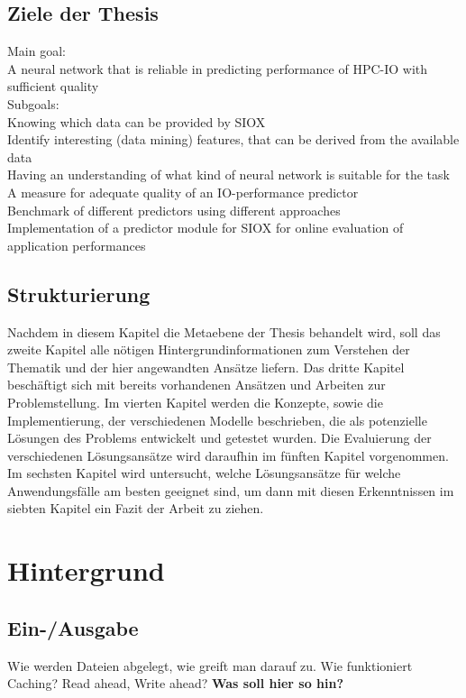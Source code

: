 \documentclass[
	12pt,
	a4paper,
	BCOR10mm,
	DIV14,
	listof=totoc,
	bibliography=totoc,
	headsepline
]{scrreprt}
\begin{document}
\section{Ziele der Thesis}
Main goal:\\
A neural network that is reliable in predicting performance of HPC-IO with sufficient quality\\

Subgoals:\\
Knowing which data can be provided by SIOX\\
Identify interesting (data mining) features, that can be derived from the available data\\
Having an understanding of what kind of neural network is suitable for the task\\
A measure for adequate quality of an IO-performance predictor \\
Benchmark of different predictors using different approaches\\
Implementation of a predictor module for SIOX for online evaluation of application performances\\

\section{Strukturierung}
Nachdem in diesem Kapitel die Metaebene der Thesis behandelt wird, soll das zweite Kapitel alle nötigen Hintergrundinformationen zum Verstehen der Thematik und der hier angewandten Ansätze liefern. Das dritte Kapitel beschäftigt sich mit bereits vorhandenen Ansätzen und Arbeiten zur Problemstellung. Im vierten Kapitel werden die Konzepte, sowie die Implementierung, der verschiedenen Modelle beschrieben, die als potenzielle Lösungen des Problems entwickelt und getestet wurden. Die Evaluierung der verschiedenen Lösungsansätze wird daraufhin im fünften Kapitel vorgenommen. Im sechsten Kapitel wird untersucht, welche Lösungsansätze für welche Anwendungsfälle am besten geeignet sind, um dann mit diesen Erkenntnissen im siebten Kapitel ein Fazit der Arbeit zu ziehen.

\chapter{Hintergrund}

\section{Ein-/Ausgabe}
\label{E/A}
Wie werden Dateien abgelegt, wie greift man darauf zu.
Wie funktioniert Caching? Read ahead, Write ahead? \textbf{Was soll hier so hin?}
\medskip
\end{document}
